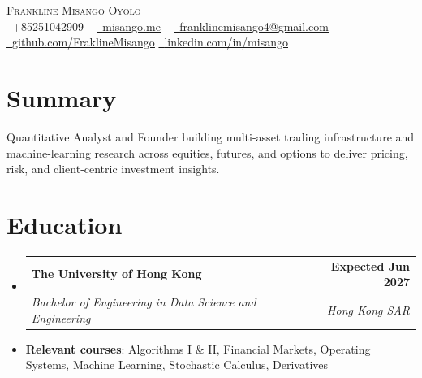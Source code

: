 \documentclass[letterpaper,11.9pt]{article}
\makeatletter
\newcommand{\resumeItem}[1]{
  \item\small{
    {#1 \vspace{-2pt}}
  }
}
\newcommand{\resumeSubheading}[4]{
  \vspace{-2pt}\item
    \begin{tabular*}{1.0\textwidth}[t]{l@{\extracolsep{\fill}}r}
      \textbf{#1} & \textbf{\small #2} \\
      \textit{\small#3} & \textit{\small #4} \\
    \end{tabular*}\vspace{-7pt}
}
\newcommand{\resumeSubHeadingListStart}{\begin{itemize}[leftmargin=0.0in, label={}]}
\newcommand{\resumeSubHeadingListEnd}{\end{itemize}}
\makeatother
\begin{document}
\begin{center}
    {\Huge \scshape Frankline Misango Oyolo } \\ \vspace{-1pt}
    \small \raisebox{-0.1\height}\faPhone\ +85251042909 ~ 
    \href{https://misango.me/}{\raisebox{-0.2\height}\faGlobe\  
    \underline{misango.me}} ~ 
    \href{mailto:franklinemisango4@gmail.com}{\raisebox{-0.2\height}\faEnvelope\  \underline{franklinemisango4@gmail.com}} ~ 
    \href{https://github.com/FranklineMisango}{\raisebox{-0.2\height}\faGithub\ \underline{github.com/FraklineMisango}}
    \href{https://linkedin.com/in/misango}{\raisebox{-0.2\height}\faLinkedin\ \underline{linkedin.com/in/misango}} ~
    \vspace{-10pt}
\end{center}

\section{Summary}
\small
Quantitative Analyst and Founder building multi-asset trading infrastructure and machine-learning research across equities, futures, and options to deliver pricing, risk, and client-centric investment insights.

\vspace{-11pt}

\section{Education}
  \resumeSubHeadingListStart
    \resumeSubheading
      {The University of Hong Kong}{ Expected Jun 2027}
      {Bachelor of Engineering in Data Science and Engineering}{Hong Kong SAR}
      \vspace{1pt}
      \resumeItem{\textbf{Relevant courses}: Algorithms I \& II, Financial Markets, Operating Systems, Machine Learning, Stochastic Calculus, Derivatives}
  \resumeSubHeadingListEnd
  \vspace{-12pt}
\end{document}
